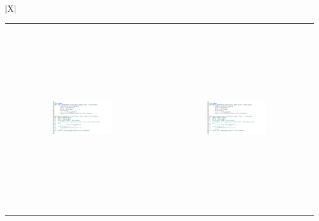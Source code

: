 \documentclass[landscape]{article}
\begin{document}
\noindent\begin{tabularx}{\textwidth}{|X|}
\hline
{} \\
\hline
\begin{center}
\begin{tabular}{cc}
\includegraphics[width=0.4\textwidth,height=8cm,keepaspectratio]{Screenshot_2025-03-09_at_15.26.02.png} &
\includegraphics[width=0.4\textwidth,height=8cm,keepaspectratio]{Screenshot_2025-03-09_at_15.26.02.png} \\
\end{tabular}
\end{center}
\end{tabularx}
\hline

\vspace{0.5cm}

\newpage
\end{document}
